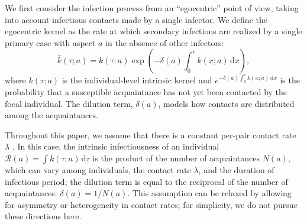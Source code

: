 \documentclass[12pt]{article}
\newcommand{\RR}{\ensuremath{{\mathcal R}}}
\begin{document}
We first consider the infection process from an ``egocentric'' point of view, taking into account infectious contacts made by a single infector.
We define the egocentric kernel as the rate at which secondary infections are realized by a single primary case with aspect $a$ in the absence of other infectors:
\begin{equation}
\hat{k}(\tau; a) = k(\tau; a) \exp \left(- \delta(a) \int_0^\tau k(x; a) \,\mathrm{d}x\right),
\end{equation}
where $k(\tau; a)$ is the individual-level intrinsic kernel and $e^{- \delta(a) \int_0^\tau k(x; a)  \,\mathrm{d}x}$ is the probability that a susceptible acquaintance has not yet been contacted by the focal individual.
The dilution term, $\delta(a)$, models how contacts are distributed among the acquaintances.

Throughout this paper, we assume that there is a constant per-pair contact rate $\lambda$ \cite{trapman2016inferring}.
In this case, the intrinsic infectiousness of an individual $\RR(a) = \int k(\tau; a) \,\mathrm{d}\tau$ is the product of the number of acquaintances $N(a)$, which can vary among individuals, the contact rate $\lambda$, and the duration of infectious period; the dilution term is equal to the reciprocal of the number of acquaintances: $\delta(a) = 1/N(a)$.
This assumption can be relaxed by allowing for asymmetry \citep{trapman2016inferring} or heterogeneity \citep{ball1997epidemics, ball2002general} in contact rates; 
for simplicity, we do not pursue these directions here.
\end{document}
